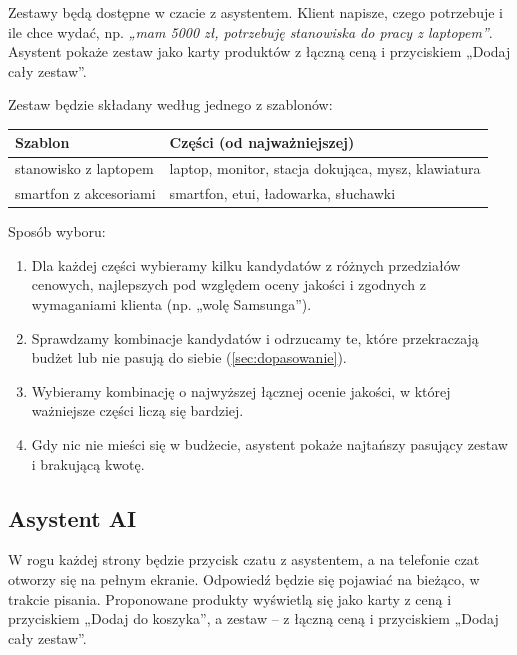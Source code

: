 \documentclass[11pt,a4paper]{article}
\begin{document}
Zestawy będą dostępne w czacie z asystentem. Klient napisze, czego potrzebuje i ile chce wydać, np.
\emph{„mam 5000 zł, potrzebuję stanowiska do pracy z laptopem”}. Asystent pokaże zestaw jako karty produktów
z łączną ceną i przyciskiem „Dodaj cały zestaw”.

Zestaw będzie składany według jednego z szablonów:

{\small
\begin{tabularx}{\textwidth}{P{4.2cm}L}
\toprule
\textbf{Szablon} & \textbf{Części (od najważniejszej)} \\
\midrule
stanowisko z laptopem & laptop, monitor, stacja dokująca, mysz, klawiatura \\
smartfon z akcesoriami & smartfon, etui, ładowarka, słuchawki \\
\bottomrule
\end{tabularx}\par\medskip
}

Sposób wyboru:
\begin{enumerate}
  \item Dla każdej części wybieramy kilku kandydatów z różnych przedziałów cenowych, najlepszych pod względem
        oceny jakości i zgodnych z wymaganiami klienta (np. „wolę Samsunga”).
  \item Sprawdzamy kombinacje kandydatów i odrzucamy te, które przekraczają budżet lub nie pasują do siebie
        (\ref{sec:dopasowanie}).
  \item Wybieramy kombinację o najwyższej łącznej ocenie jakości, w której ważniejsze części liczą się
        bardziej.
  \item Gdy nic nie mieści się w budżecie, asystent pokaże najtańszy pasujący zestaw i brakującą kwotę.
\end{enumerate}

\subsection{Asystent AI}\label{sec:asystent}

W rogu każdej strony będzie przycisk czatu z asystentem, a na telefonie czat otworzy się na pełnym ekranie.
Odpowiedź będzie się pojawiać na bieżąco, w trakcie pisania. Proponowane produkty wyświetlą się jako karty
z ceną i przyciskiem „Dodaj do koszyka”, a zestaw -- z łączną ceną i przyciskiem „Dodaj cały zestaw”.
\end{document}
